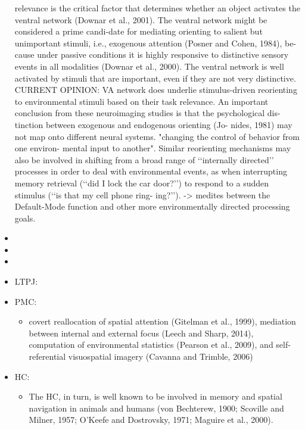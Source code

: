 \documentclass{article} %
\begin{document}
\begin{itemize}
relevance is the critical factor that determines whether an object activates the ventral network (Downar et al., 2001). The ventral network might be considered a prime candi-date for mediating orienting to salient but unimportant stimuli, i.e., exogenous attention (Posner and Cohen, 1984), be- cause under passive conditions it is highly responsive to distinctive sensory
events in all modalities (Downar et al., 2000). The ventral network is well activated by stimuli that are important, even if they are not very distinctive. 
CURRENT OPINION: VA network does underlie  stimulus-driven reorienting to environmental stimuli based on their task relevance. An important conclusion from these neuroimaging studies is that the psychological dis- tinction between exogenous and endogenous orienting (Jo- nides, 1981) may not map onto different neural systems. "changing the control of behavior from one environ- mental input to another". Similar reorienting mechanisms may also be involved in shifting from a broad range of ‘‘internally directed’’ processes in order to deal with environmental events, as when interrupting memory retrieval (‘‘did I lock the car door?’’) to respond to a sudden stimulus (‘‘is that my cell phone ring- ing?’’). -> medites between the Default-Mode function and other more environmentally directed processing goals.






\item



\item


\item




\item

LTPJ:



\item
  PMC:
  \begin{itemize}
    \item
covert reallocation of spatial attention (Gitelman et al., 1999), mediation between internal and external focus (Leech and Sharp, 2014), computation of environmental statistics (Pearson et al., 2009), and self-referential visuospatial imagery (Cavanna and Trimble, 2006)
  \end{itemize}




\item
HC:
\begin{itemize}
  \item
The HC, in turn, is well known to be involved in memory and spatial navigation in animals and humans (von Bechterew, 1900; Scoville and Milner, 1957; O’Keefe and Dostrovsky, 1971; Maguire et al., 2000).


\end{itemize}
\end{itemize}
\end{document}
